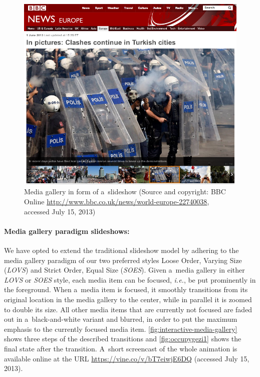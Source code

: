 \begin{figure}[!ht]
  \centering
  \includegraphics[width=0.8\columnwidth]{occupygezibbc.png}
  \caption[Media gallery in form of a~slideshow]{Media gallery in form of a~slideshow
  (Source and copyright: BBC Online \url{http://www.bbc.co.uk/news/world-europe-22740038}, accessed July 15, 2013)}
  \label{fig:occupygezibbc}
\end{figure}

\paragraph{Media gallery paradigm slideshows:}

We have opted to extend the traditional slideshow model
by adhering to the media gallery paradigm of our two preferred styles
Loose Order, Varying Size (\emph{LOVS}) and Strict Order, Equal Size (\emph{SOES}).
Given a~media gallery in either \emph{LOVS} or \emph{SOES} style,
each media item can be focused,
\emph{i.e.}, be put prominently in the foreground.
When a~media item is focused, it smoothly transitions
from its original location in the media gallery to the center,
while in parallel it is zoomed to double its size.
All other media items that are currently not focused are faded out
in a~black-and-white variant and blurred, in order to put the maximum emphasis
to the currently focused media item.
\autoref{fig:interactive-media-gallery} shows three steps of the described transitions and
\autoref{fig:occupygezi1} shows the final state after the transition.
A~short screencast of the whole animation is available online
at the URL \url{https://vine.co/v/bT7eiwjE6DQ} (accessed July 15, 2013).

